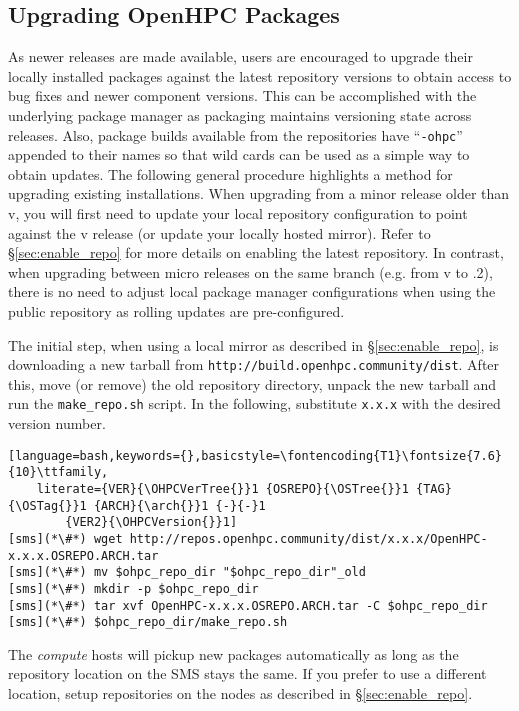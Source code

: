 \subsection{Upgrading OpenHPC Packages}  \label{appendix:upgrade}


As newer \OHPC{} releases are made available, users are encouraged to upgrade
their locally installed packages against the latest repository versions to
obtain access to bug fixes and newer component versions. This can be
accomplished with the underlying package manager as \OHPC{} packaging maintains
versioning state across releases. Also, package builds available from the
\OHPC{} repositories have ``\texttt{-ohpc}'' appended to their names so that
wild cards can be used as a simple way to obtain updates. The following general
procedure highlights a method for upgrading existing installations.
When upgrading from a minor release older than v\OHPCVerTree{}, you will first
need to update your local \OHPC{} repository configuration to point against the
v\OHPCVerTree{} release (or update your locally hosted mirror). Refer to
\S\ref{sec:enable_repo} for more details on enabling the latest
repository. In contrast, when upgrading between micro releases on the same
branch (e.g. from v\OHPCVerTree{} to \OHPCVerTree{}.2), there is no need to
adjust local package manager configurations when using the public repository as
rolling updates are pre-configured.

The initial step, when using a local mirror as described in
\S\ref{sec:enable_repo}, is downloading a new tarball from \texttt{http://build.openhpc.community/dist}.
After this, move (or remove) the old repository directory, unpack
the new tarball and run the \texttt{make\_repo.sh} script. In the following,
substitute \texttt{x.x.x} with the desired version number.

\begin{lstlisting}[language=bash,keywords={},basicstyle=\fontencoding{T1}\fontsize{7.6}{10}\ttfamily,
	literate={VER}{\OHPCVerTree{}}1 {OSREPO}{\OSTree{}}1 {TAG}{\OSTag{}}1 {ARCH}{\arch{}}1 {-}{-}1
        {VER2}{\OHPCVersion{}}1]
[sms](*\#*) wget http://repos.openhpc.community/dist/x.x.x/OpenHPC-x.x.x.OSREPO.ARCH.tar
[sms](*\#*) mv $ohpc_repo_dir "$ohpc_repo_dir"_old
[sms](*\#*) mkdir -p $ohpc_repo_dir
[sms](*\#*) tar xvf OpenHPC-x.x.x.OSREPO.ARCH.tar -C $ohpc_repo_dir
[sms](*\#*) $ohpc_repo_dir/make_repo.sh
\end{lstlisting}

The {\em compute} hosts will pickup new packages automatically as long as the
repository location on the SMS stays the same. If you prefer to use a different
location, setup repositories on the nodes as described in
\S\ref{sec:enable_repo}.

